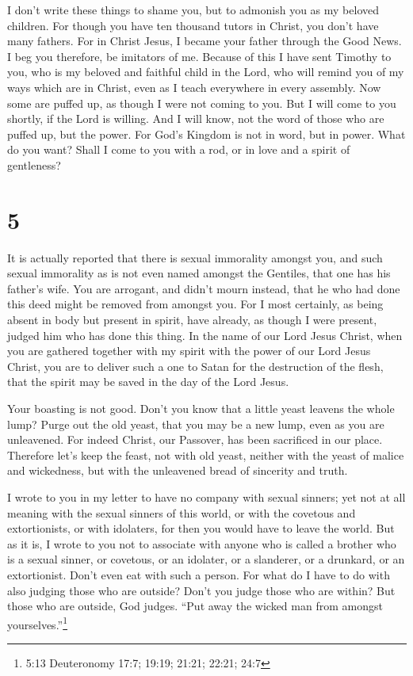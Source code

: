 I don't write these things to shame you, but to admonish
you as my beloved children.  For though you have ten
thousand tutors in Christ, you don't have many fathers. For in Christ
Jesus, I became your father through the Good News.  I beg
you therefore, be imitators of me.  Because of this I have
sent Timothy to you, who is my beloved and faithful child in the Lord,
who will remind you of my ways which are in Christ, even as I teach
everywhere in every assembly.  Now some are puffed up, as
though I were not coming to you.  But I will come to you
shortly, if the Lord is willing. And I will know, not the word of those
who are puffed up, but the power.  For God's Kingdom is not
in word, but in power.  What do you want? Shall I come to
you with a rod, or in love and a spirit of gentleness?

\hypertarget{section-4}{%
\section{5}\label{section-4}}

 It is actually reported that there is sexual immorality
amongst you, and such sexual immorality as is not even named amongst the
Gentiles, that one has his father's wife.  You are arrogant,
and didn't mourn instead, that he who had done this deed might be
removed from amongst you.  For I most certainly, as being
absent in body but present in spirit, have already, as though I were
present, judged him who has done this thing.  In the name of
our Lord Jesus Christ, when you are gathered together with my spirit
with the power of our Lord Jesus Christ,  you are to deliver
such a one to Satan for the destruction of the flesh, that the spirit
may be saved in the day of the Lord Jesus.

 Your boasting is not good. Don't you know that a little
yeast leavens the whole lump?  Purge out the old yeast, that
you may be a new lump, even as you are unleavened. For indeed Christ,
our Passover, has been sacrificed in our place.  Therefore
let's keep the feast, not with old yeast, neither with the yeast of
malice and wickedness, but with the unleavened bread of sincerity and
truth.

 I wrote to you in my letter to have no company with sexual
sinners;  yet not at all meaning with the sexual sinners of
this world, or with the covetous and extortionists, or with idolaters,
for then you would have to leave the world.  But as it is,
I wrote to you not to associate with anyone who is called a brother who
is a sexual sinner, or covetous, or an idolater, or a slanderer, or a
drunkard, or an extortionist. Don't even eat with such a person.
 For what do I have to do with also judging those who are
outside? Don't you judge those who are within?  But those
who are outside, God judges. ``Put away the wicked man from amongst
yourselves.''\footnote{5:13 Deuteronomy 17:7; 19:19; 21:21; 22:21; 24:7}

